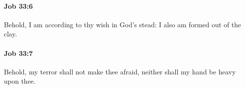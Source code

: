 		\paragraph{Job 33:6} %
			\label{JOB-33-6}

			Behold, I am according to thy wish in God’s stead: I also am formed out of the clay.


		\paragraph{Job 33:7} %
			\label{JOB-33-7}

			Behold, my terror shall not make thee afraid, neither shall my hand be heavy upon thee.



